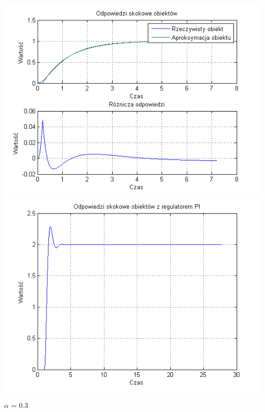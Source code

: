 \documentclass[10pt,a4paper]{article}
\begin{document}
\begin{center}
\includegraphics[scale=1]{images/jeden/skrypt_119.png}\\
\includegraphics[scale=1]{images/jeden/skrypt_120.png}\\
\end{center}
\newpage
$\alpha$ = 0.3
\end{document}

